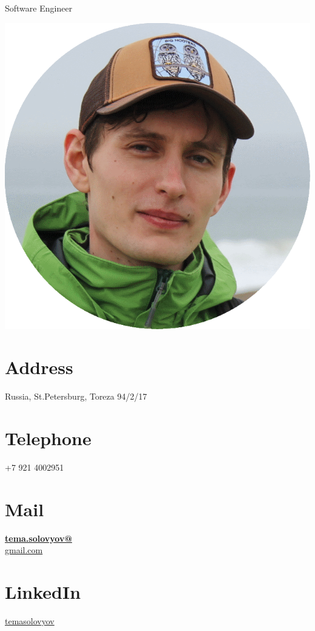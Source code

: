 \documentclass[]{friggeri-cv}
\begin{document}
      {Software Engineer}
      

\begin{aside}
  \includegraphics[scale=0.18]{img/ava.png}
  \section{Address}
    Russia, St.Petersburg,
    Toreza 94/2/17
    ~
  \section{Telephone}
    +7 921 4002951
    ~
  \section{Mail}
    \href{mailto:tema.solovyov@gmail.com}{\textbf{tema.solovyov@}\\gmail.com}
    ~
  \section{LinkedIn}
    \href{https://www.linkedin.com/in/temasolovyov}{temasolovyov}
    ~

\end{aside}
\end{document}
